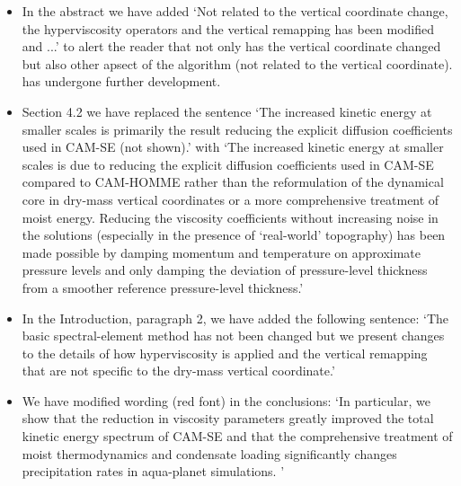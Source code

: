 \documentclass[11pt]{article}
\begin{document}
\begin{itemize}
\item In the abstract we have added `Not related to the vertical coordinate change, the hyperviscosity operators and the vertical remapping has been modified and ...' to alert the reader that not only has the vertical coordinate changed but also other apsect of the algorithm (not related to the vertical coordinate). has undergone further development.
\item Section 4.2 we have replaced the sentence `The increased kinetic energy at smaller scales is primarily the result reducing the explicit diffusion coefficients used in CAM-SE (not shown).' with `The increased kinetic energy at smaller scales is due to reducing the explicit diffusion coefficients used in CAM-SE compared to CAM-HOMME rather than the reformulation of the dynamical core in dry-mass vertical coordinates or a more comprehensive treatment of moist energy. Reducing the viscosity coefficients without increasing noise in the solutions (especially in the presence of `real-world' topography) has been made possible by damping momentum and temperature on approximate pressure levels and only damping the deviation of pressure-level thickness from a smoother reference pressure-level thickness.'
\item In the Introduction, paragraph 2, we have added the following sentence: `The basic spectral-element method has not been changed but we present changes to the details of how hyperviscosity is applied and the vertical remapping that are not specific to the dry-mass vertical coordinate.' 
\item We have modified wording (red font) in the conclusions: `In particular, we show that the reduction in viscosity parameters {\color{red}{(made possible by changes to the details of how hyperviscosity is applied)}} greatly improved the total kinetic energy spectrum of CAM-SE and that the comprehensive treatment of moist thermodynamics and condensate loading significantly changes precipitation rates in aqua-planet simulations. {\color{red}{These changes are not due to the dry-mass vertical coordinate per se but we argue that the comprehensive treatment of energy in the Earth system model as a whole is much simpler in a dry-mass vertical coordinate which stays fixed during parameterization updates.}}'


\end{itemize}
\end{document}
